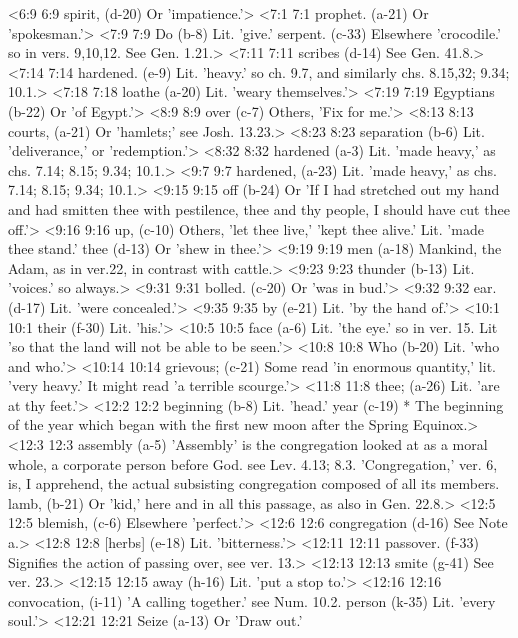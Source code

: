 <6:9 6:9  spirit, (d-20)  Or 'impatience.'>
<7:1 7:1  prophet. (a-21)  Or 'spokesman.'>
<7:9 7:9  Do (b-8)  Lit. 'give.'
  serpent. (c-33)  Elsewhere 'crocodile.' so in vers. 9,10,12. See Gen. 1.21.>
<7:11 7:11  scribes (d-14)  See Gen. 41.8.>
<7:14 7:14  hardened. (e-9)  Lit. 'heavy.' so ch. 9.7, and similarly chs. 8.15,32; 9.34;  10.1.>
<7:18 7:18  loathe (a-20)  Lit. 'weary themselves.'>
<7:19 7:19  Egyptians (b-22)  Or 'of Egypt.'>
<8:9 8:9  over (c-7)  Others, 'Fix for me.'>
<8:13 8:13  courts, (a-21)  Or 'hamlets;' see Josh. 13.23.>
<8:23 8:23  separation (b-6)  Lit. 'deliverance,' or 'redemption.'>
<8:32 8:32  hardened (a-3) Lit. 'made heavy,' as chs. 7.14; 8.15; 9.34; 10.1.>
<9:7 9:7  hardened, (a-23)  Lit. 'made heavy,' as chs. 7.14; 8.15; 9.34; 10.1.>
<9:15 9:15  off (b-24)  Or 'If I had stretched out my hand and had smitten thee with  pestilence, thee and thy people, I should have cut thee off.'>
<9:16 9:16  up, (c-10)  Others, 'let thee live,' 'kept thee alive.' Lit. 'made thee  stand.'
  thee (d-13)  Or 'shew in thee.'>
<9:19 9:19  men (a-18)  Mankind, the Adam, as in ver.22, in contrast with cattle.>
<9:23 9:23  thunder (b-13)  Lit. 'voices.' so always.>
<9:31 9:31  bolled. (c-20)  Or 'was in bud.'>
<9:32 9:32  ear. (d-17)  Lit. 'were concealed.'>
<9:35 9:35  by (e-21)  Lit. 'by the hand of.'>
<10:1 10:1  their (f-30)  Lit. 'his.'>
<10:5 10:5  face (a-6)  Lit. 'the eye.' so in ver. 15. Lit 'so that the land will not  be able to be seen.'>
<10:8 10:8  Who (b-20)  Lit. 'who and who.'>
<10:14 10:14  grievous; (c-21)  Some read 'in enormous quantity,' lit. 'very heavy.' It might  read 'a terrible scourge.'>
<11:8 11:8  thee; (a-26)  Lit. 'are at thy feet.'>
<12:2 12:2  beginning (b-8)  Lit. 'head.'
  year (c-19)  * The beginning of the year which began with the first new  moon after the Spring Equinox.>
<12:3 12:3  assembly (a-5)  'Assembly' is the congregation looked at as a moral whole, a  corporate person before God. see Lev. 4.13; 8.3.  'Congregation,' ver. 6, is, I apprehend, the actual subsisting  congregation composed of all its members.
  lamb, (b-21)  Or 'kid,' here and in all this passage, as also in Gen. 22.8.>
<12:5 12:5  blemish, (c-6)  Elsewhere 'perfect.'>
<12:6 12:6  congregation (d-16)  See Note a.>
<12:8 12:8  [herbs] (e-18)  Lit. 'bitterness.'>
<12:11 12:11  passover. (f-33)  Signifies the action of passing over, see ver. 13.>
<12:13 12:13  smite (g-41)  See ver. 23.>
<12:15 12:15  away (h-16)  Lit. 'put a stop to.'>
<12:16 12:16  convocation, (i-11)  'A calling together.' see Num. 10.2.
  person (k-35)  Lit. 'every soul.'>
<12:21 12:21  Seize (a-13)  Or 'Draw out.'
